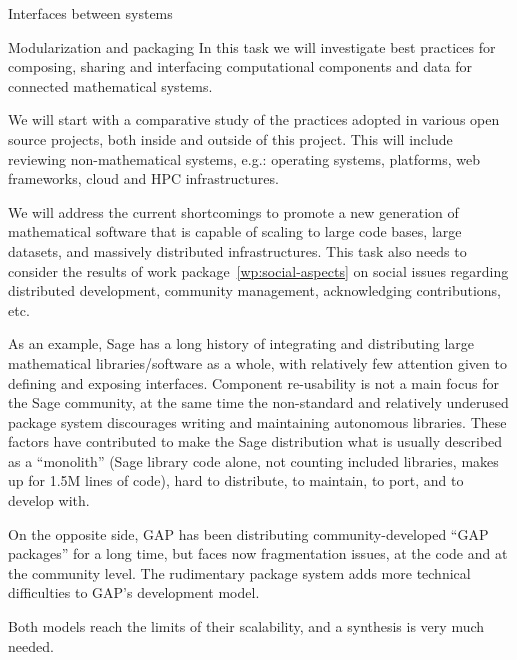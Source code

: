 \begin{Workpackage}{\thewpno}
\begin{task}{Interfaces between systems}
  \end{task}

  \begin{task}{Modularization and packaging}
    In this task we will investigate best practices for composing,
    sharing and interfacing computational components and data for
    connected mathematical systems.

    We will start with a comparative study of the practices adopted in
    various open source projects, both inside and outside of this
    project. This will include reviewing non-mathematical systems,
    e.g.: operating systems, platforms, web frameworks, cloud and HPC
    infrastructures.

    We will address the current shortcomings to promote a new
    generation of mathematical software that is capable of scaling to
    large code bases, large datasets, and massively distributed
    infrastructures. This task also needs to consider the results of
    work package~\ref{wp:social-aspects} on social issues regarding
    distributed development, community management, acknowledging
    contributions, etc.

    As an example, Sage has a long history of integrating and
    distributing large mathematical libraries/software as a whole,
    with relatively few attention given to defining and exposing
    interfaces. Component re-usability is not a main focus for the
    Sage community, at the same time the non-standard and relatively
    underused package system discourages writing and maintaining
    autonomous libraries. These factors have contributed to make the
    Sage distribution what is usually described as a ``monolith''
    (Sage library code alone, not counting included libraries, makes
    up for 1.5M lines of code), hard to distribute, to maintain, to
    port, and to develop with.

    On the opposite side, GAP has been distributing
    community-developed ``GAP packages'' for a long time, but faces
    now fragmentation issues, at the code and at the community
    level. The rudimentary package system adds more technical
    difficulties to GAP's development model.

    Both models reach the limits of their scalability, and a synthesis
    is very much needed.
  \end{task}
  

\end{Workpackage}
